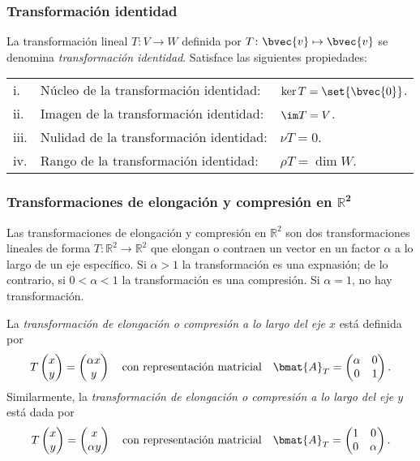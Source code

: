 \documentclass{fmbnotes}
\begin{document}
\subsubsection{Transformación identidad}
La transformación lineal \(T\colon V\to W\) definida por \(T\colon\bvec{v}\mapsto\bvec{v}\) se denomina \emph{transformación identidad}. Satisface las siguientes propiedades:
\begin{longtable}{lp{}p{}}
	\rule[1ex]{0pt}{2.5ex}i.&Núcleo de la transformación identidad: &\(\ker T = \set{\bvec{0}}\). \\
	\rule[1ex]{0pt}{2.5ex}ii.&Imagen de la transformación identidad: &\(\im T = V\). \\
	\rule[1ex]{0pt}{2.5ex}iii.&Nulidad de la transformación identidad: &\(\nu T = 0\). \\
	\rule[1ex]{0pt}{2.5ex}iv.&Rango de la transformación identidad: &\(\rho T = \dim W\). \\
\end{longtable}

\subsubsection[Transformaciones de elongación y compresión en \(\mathbb{R}^{2}\)]{Transformaciones de elongación y compresión en \(\bm{\mathbb{R}^{2}}\)} 

Las transformaciones de elongación y compresión en \(\mathbb{R}^{2}\) son dos transformaciones lineales de forma \(T\colon\mathbb{R}^{2}\to\mathbb{R}^{2}\) que elongan o contraen un vector en un factor \(\alpha\) a lo largo de un eje específico. Si \(\alpha>1\) la transformación es una expnasión; de lo contrario, si \(0<\alpha<1\) la transformación es una compresión. Si \(\alpha=1\), no hay transformación.

La \emph{transformación de elongación o compresión a lo largo del eje \(x\)} está definida por 
\[T\begin{pmatrix}
x \\ y
\end{pmatrix}=\begin{pmatrix}
\alpha x \\ y
\end{pmatrix} \quad \text{con representación matricial} \quad \bmat{A}_T=\begin{pmatrix}
\alpha & 0 \\ 0 & 1
\end{pmatrix}.\]
Similarmente, la \emph{transformación de elongación o compresión a lo largo del eje \(y\)} está dada por  
\[T\begin{pmatrix}
x \\ y
\end{pmatrix}=\begin{pmatrix}
x \\  \alpha y
\end{pmatrix} \quad \text{con representación matricial} \quad \bmat{A}_T=\begin{pmatrix}
1 & 0 \\ 0 & \alpha
\end{pmatrix}.\]
\end{document}
